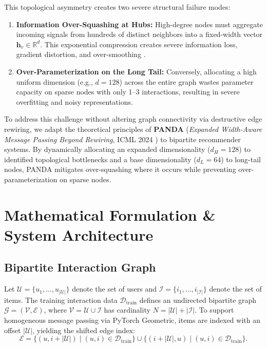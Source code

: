 \documentclass[11pt,a4paper]{article}
\begin{document}
This topological asymmetry creates two severe structural failure modes:
\begin{enumerate}
    \item \textbf{Information Over-Squashing at Hubs:} High-degree nodes must aggregate incoming signals from hundreds of distinct neighbors into a fixed-width vector $\mathbf{h}_v \in \mathbb{R}^d$. This exponential compression creates severe information loss, gradient distortion, and over-smoothing \cite{topping2021understanding}.
    \item \textbf{Over-Parameterization on the Long Tail:} Conversely, allocating a high uniform dimension (e.g., $d=128$) across the entire graph wastes parameter capacity on sparse nodes with only 1--3 interactions, resulting in severe overfitting and noisy representations.
\end{enumerate}

To address this challenge without altering graph connectivity via destructive edge rewiring, we adapt the theoretical principles of \textbf{PANDA} (\textit{Expanded Width-Aware Message Passing Beyond Rewiring}, ICML 2024 \cite{panda2024}) to bipartite recommender systems. By dynamically allocating an expanded dimensionality ($d_H = 128$) to identified topological bottlenecks and a base dimensionality ($d_L = 64$) to long-tail nodes, PANDA mitigates over-squashing where it occurs while preventing over-parameterization on sparse nodes.

\section{Mathematical Formulation \& System Architecture}

\subsection{Bipartite Interaction Graph}
Let $\mathcal{U} = \{u_1, \dots, u_{|\mathcal{U}|}\}$ denote the set of users and $\mathcal{I} = \{i_1, \dots, i_{|\mathcal{I}|}\}$ denote the set of items. The training interaction data $\mathcal{D}_{\text{train}}$ defines an undirected bipartite graph $\mathcal{G} = (\mathcal{V}, \mathcal{E})$, where $\mathcal{V} = \mathcal{U} \cup \mathcal{I}$ has cardinality $N = |\mathcal{U}| + |\mathcal{I}|$. To support homogeneous message passing via PyTorch Geometric, items are indexed with an offset $|\mathcal{U}|$, yielding the shifted edge index:
\begin{equation}
    \mathcal{E} = \{(u, i + |\mathcal{U}|) \mid (u, i) \in \mathcal{D}_{\text{train}}\} \cup \{(i + |\mathcal{U}|, u) \mid (u, i) \in \mathcal{D}_{\text{train}}\}.
\end{equation}
\end{document}
